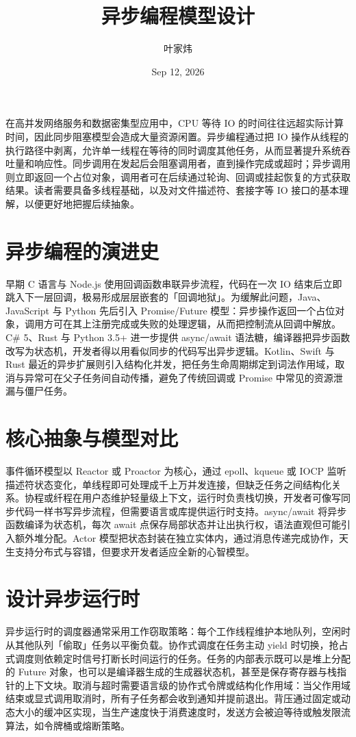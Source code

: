 \title{异步编程模型设计}
\author{叶家炜}
\date{Sep 12, 2026}
\maketitle
在高并发网络服务和数据密集型应用中，CPU 等待 IO 的时间往往远超实际计算时间，因此同步阻塞模型会造成大量资源闲置。异步编程通过把 IO 操作从线程的执行路径中剥离，允许单一线程在等待的同时调度其他任务，从而显著提升系统吞吐量和响应性。同步调用在发起后会阻塞调用者，直到操作完成或超时；异步调用则立即返回一个占位对象，调用者可在后续通过轮询、回调或挂起恢复的方式获取结果。读者需要具备多线程基础，以及对文件描述符、套接字等 IO 接口的基本理解，以便更好地把握后续抽象。\par
\chapter{异步编程的演进史}
早期 C 语言与 Node.js 使用回调函数串联异步流程，代码在一次 IO 结束后立即跳入下一层回调，极易形成层层嵌套的「回调地狱」。为缓解此问题，Java、JavaScript 与 Python 先后引入 Promise/Future 模型：异步操作返回一个占位对象，调用方可在其上注册完成或失败的处理逻辑，从而把控制流从回调中解放。C\#{} 5、Rust 与 Python 3.5+ 进一步提供 async/await 语法糖，编译器把异步函数改写为状态机，开发者得以用看似同步的代码写出异步逻辑。Kotlin、Swift 与 Rust 最近的异步扩展则引入结构化并发，把任务生命周期绑定到词法作用域，取消与异常可在父子任务间自动传播，避免了传统回调或 Promise 中常见的资源泄漏与僵尸任务。\par
\chapter{核心抽象与模型对比}
事件循环模型以 Reactor 或 Proactor 为核心，通过 epoll、kqueue 或 IOCP 监听描述符状态变化，单线程即可处理成千上万并发连接，但缺乏任务之间结构化关系。协程或纤程在用户态维护轻量级上下文，运行时负责栈切换，开发者可像写同步代码一样书写异步流程，但需要语言或库提供运行时支持。async/await 将异步函数编译为状态机，每次 await 点保存局部状态并让出执行权，语法直观但可能引入额外堆分配。Actor 模型把状态封装在独立实体内，通过消息传递完成协作，天生支持分布式与容错，但要求开发者适应全新的心智模型。\par
\chapter{设计异步运行时}
异步运行时的调度器通常采用工作窃取策略：每个工作线程维护本地队列，空闲时从其他队列「偷取」任务以平衡负载。协作式调度在任务主动 yield 时切换，抢占式调度则依赖定时信号打断长时间运行的任务。任务的内部表示既可以是堆上分配的 Future 对象，也可以是编译器生成的生成器状态机，甚至是保存寄存器与栈指针的上下文块。取消与超时需要语言级的协作式令牌或结构化作用域：当父作用域结束或显式调用取消时，所有子任务都会收到通知并提前退出。背压通过固定或动态大小的缓冲区实现，当生产速度快于消费速度时，发送方会被迫等待或触发限流算法，如令牌桶或熔断策略。\par
